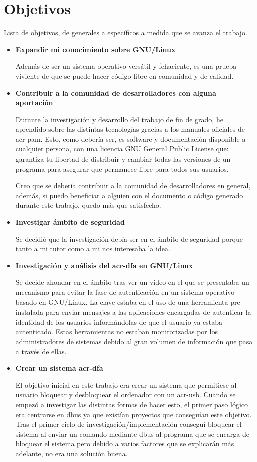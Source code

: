 \documentclass[twoside, titlepage, 12pt, a4paper]{article}
\let\oldsection\section
\def\section{\cleardoublepage\oldsection}
\begin{document}
\section{Objetivos}
Lista de objetivos, de generales a específicos a medida que se avanza el trabajo.
\begin{itemize}
	\item{\textbf{Expandir mi conocimiento sobre \gls{GNU/Linux}}}\par
		Además de ser un sistema operativo versátil y fehaciente, es una prueba viviente de que se puede hacer código libre en comunidad y de calidad.
	\item{\textbf{Contribuir a la comunidad de desarrolladores con alguna aportación}}\par
		Durante la investigación y desarrollo del trabajo de fin de grado, he aprendido sobre las distintas tecnologías gracias a los manuales oficiales de \gls{acr-pam}. Esto, como debería ser, es software y documentación disponible a cualquier persona, con una licencia GNU General Public License que: garantiza tu libertad de distribuir y cambiar todas las versiones de un programa para asegurar que permanece libre para todos sus usuarios. \cite{GNU-GPL} \par
		Creo que se debería contribuir a la comunidad de desarrolladores en general, además, si puedo beneficiar a alguien con el documento o código generado durante este trabajo, quedo más que satisfecho.
	\item{\textbf{Investigar ámbito de seguridad}}\par
		Se decidió que la investigación debía ser en el ámbito de seguridad porque tanto a mi tutor como a mi nos interesaba la idea.
	\item{\textbf{Investigación y análisis del \gls{acr-dfa} en \gls{GNU/Linux}}}\par
		Se decide ahondar en el ámbito tras ver un vídeo en el que se presentaba un mecanismo para evitar la fase de autenticación en un sistema operativo basado en \gls{GNU/Linux}. La clave estaba en el uso de una herramienta pre-instalada para enviar mensajes a las aplicaciones encargadas de autenticar la identidad de los usuarios informándolas de que el usuario ya estaba autenticado. Estas herramientas no estaban monitorizadas por los administradores de sistemas debido al gran volumen de información que pasa a través de ellas.
	\item{\textbf{Crear un sistema \gls{acr-dfa}}}\par
		El objetivo inicial en este trabajo era crear un sistema que permitiese al usuario bloquear y desbloquear el ordenador con un \gls{acr-usb}. Cuando se empezó a investigar las distintas formas de hacer esto, el primer paso lógico era centrarse en \gls{dbus} ya que existían proyectos que conseguían este objetivo. Tras el primer ciclo de investigación/implementación conseguí bloquear el sistema al enviar un comando mediante \gls{dbus} al programa que se encarga de bloquear el sistema pero debido a varios factores que se explicarán más adelante, no era una solución buena. \par 

\end{itemize}
\end{document}
